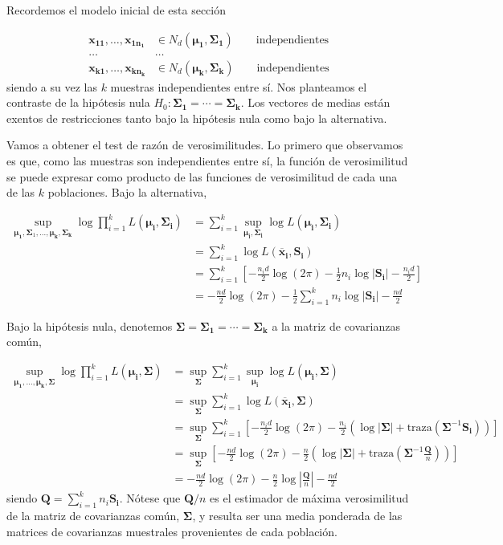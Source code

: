 \documentclass[
  a4paper,
  oneside]{scrbook}
\theoremstyle{definition}
\theoremstyle{definition}
\theoremstyle{definition}
\theoremstyle{definition}
\theoremstyle{remark}
\begin{document}
Recordemos el modelo inicial de esta sección

\[\begin{aligned}
\bm{x_{11}},\ldots,\bm{x_{1n_1}}&\in  N_d(\bm{\mu_1},\bm{\Sigma_1}) \qquad \mbox{independientes}\\
\ldots & \ldots \\
\bm{x_{k1}},\ldots,\bm{x_{kn_k}}&\in  N_d(\bm{\mu_k},\bm{\Sigma_k}) \qquad \mbox{independientes}\end{aligned}\]
siendo a su vez las \(k\) muestras independientes entre sí. Nos planteamos
el contraste de la hipótesis nula
\(H_0:\bm{\Sigma_1}=\cdots=\bm{\Sigma_k}\). Los vectores de medias están
exentos de restricciones tanto bajo la hipótesis nula como bajo la
alternativa.

Vamos a obtener el test de razón de verosimilitudes. Lo primero que
observamos es que, como las muestras son independientes entre sí, la
función de verosimilitud se puede expresar como producto de las
funciones de verosimilitud de cada una de las \(k\) poblaciones. Bajo la
alternativa,

\[\begin{aligned}
\sup_{\bm{\mu_1},\bm\Sigma_1,\ldots,\bm{\mu_k},\bm {\Sigma_k}}
\log \prod_{i=1}^k L\left(\bm{\mu_i},\bm{\Sigma_i}\right)
&=\sum_{i=1}^k \sup_{\bm{\mu_i},\bm {\Sigma_i}} \log L\left(\bm{\mu_i},\bm {\Sigma_i}\right)\\
&=\sum_{i=1}^k \log L\left(\bm{\overline{x}_i},\bm{S_i}\right)  \\
&=\sum_{i=1}^k \left[-\frac{n_id}{2}\log (2\pi)
-\frac{1}{2} n_i\log \left|\bm{S_i}\right|-\frac{n_id}{2}\right]\\
&=-\frac{nd}{2}\log (2\pi)
-\frac{1}{2}\sum_{i=1}^k n_i\log \left|\bm{S_i}\right|-\frac{nd}{2}\end{aligned}\]

Bajo la hipótesis nula, denotemos
\(\bm\Sigma=\bm{\Sigma_1}=\cdots=\bm {\Sigma_k}\) a la matriz de
covarianzas común,

\[\begin{aligned}
\sup_{\bm{\mu_1},\ldots,\bm{\mu_k},\bm\Sigma}
\log \prod_{i=1}^k L\left(\bm{\mu_i},\bm\Sigma\right)
&=\sup_{\bm\Sigma}\sum_{i=1}^k \sup_{\bm{\mu_i}} \log L\left(\bm{\mu_i},\bm\Sigma\right)\\
&=\sup_{\bm\Sigma}\sum_{i=1}^k \log L\left(\bm{\overline{x}_i},\bm\Sigma\right) \\
&=\sup_{\bm\Sigma}\sum_{i=1}^k \left[-\frac{n_id}{2}\log (2\pi)
-\frac{n_i}{2}
\left(\log |\bm\Sigma|+\mbox{traza}\left(\bm\Sigma^{-1}\bm{S_i}\right)\right)\right] \\
&=\sup_{\bm\Sigma}\left[-\frac{nd}{2}\log (2\pi)
-\frac{n}{2}
\left(\log |\bm\Sigma|+\mbox{traza}\left(\bm\Sigma^{-1}\frac{\bm{Q}}{n}\right)\right)\right]\\
&=-\frac{nd}{2}\log (2\pi)
-\frac{n}{2} \log \left|\frac{\bm{Q}}{n}\right|-\frac{nd}{2}\end{aligned}\]
siendo \(\bm{Q}=\sum_{i=1}^k n_i\bm{S_i}\). Nótese que \(\bm{Q}/n\) es el
estimador de máxima verosimilitud de la matriz de covarianzas común,
\(\bm\Sigma\), y resulta ser una media ponderada de las matrices de
covarianzas muestrales provenientes de cada población.
\end{document}
